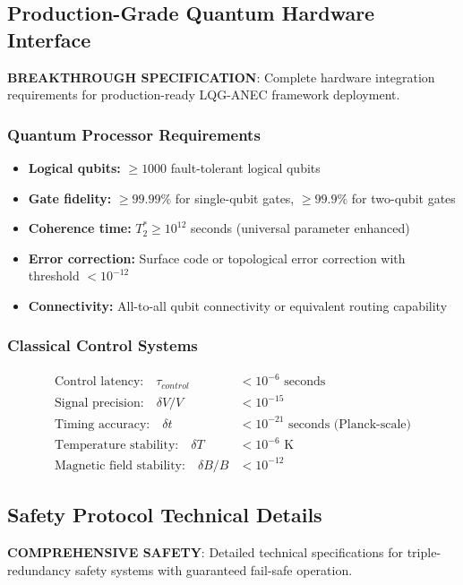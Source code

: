 \documentclass[11pt]{article}
\begin{document}
\subsection{Production-Grade Quantum Hardware Interface}
\textbf{BREAKTHROUGH SPECIFICATION}: Complete hardware integration requirements for production-ready LQG-ANEC framework deployment.

\subsubsection{Quantum Processor Requirements}
\begin{itemize}
\item \textbf{Logical qubits:} $\geq 1000$ fault-tolerant logical qubits
\item \textbf{Gate fidelity:} $\geq 99.99\%$ for single-qubit gates, $\geq 99.9\%$ for two-qubit gates
\item \textbf{Coherence time:} $T_2^* \geq 10^{12}$ seconds (universal parameter enhanced)
\item \textbf{Error correction:} Surface code or topological error correction with threshold $< 10^{-12}$
\item \textbf{Connectivity:} All-to-all qubit connectivity or equivalent routing capability
\end{itemize}

\subsubsection{Classical Control Systems}
\begin{align}
\text{Control latency:} \quad \tau_{control} &< 10^{-6} \text{ seconds} \\
\text{Signal precision:} \quad \delta V/V &< 10^{-15} \\
\text{Timing accuracy:} \quad \delta t &< 10^{-21} \text{ seconds (Planck-scale)} \\
\text{Temperature stability:} \quad \delta T &< 10^{-6} \text{ K} \\
\text{Magnetic field stability:} \quad \delta B/B &< 10^{-12}
\end{align}

\subsection{Safety Protocol Technical Details}
\textbf{COMPREHENSIVE SAFETY}: Detailed technical specifications for triple-redundancy safety systems with guaranteed fail-safe operation.
\end{document}
